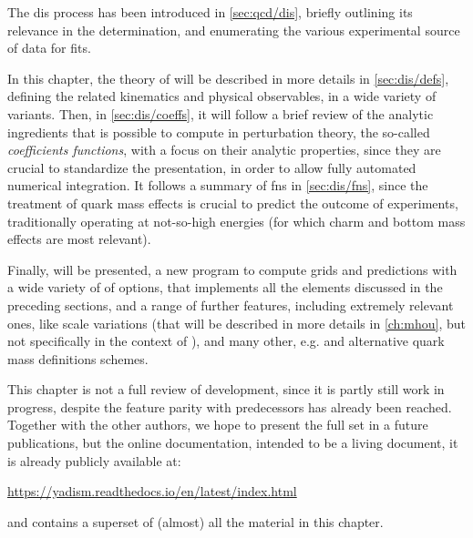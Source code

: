 
The \acrfull{dis} process has been introduced in \cref{sec:qcd/dis}, briefly
outlining its relevance in the \pdf determination, and enumerating the various
experimental source of \dis data for \pdf fits.

In this chapter, the theory of \dis will be described in more details in
\cref{sec:dis/defs}, defining the related kinematics and physical observables,
in a wide variety of variants.
Then, in \cref{sec:dis/coeffs}, it will follow a brief review of the analytic
ingredients that is possible to compute in perturbation theory, the so-called
\textit{coefficients functions}, with a focus on their analytic properties,
since they are crucial to standardize the presentation, in order to allow fully
automated numerical integration.
It follows a summary of \acrlong{fns} in \cref{sec:dis/fns}, since the
treatment of quark mass effects is crucial to predict the outcome of \dis
experiments, traditionally operating at not-so-high energies (for which charm
and bottom mass effects are most relevant).

Finally, \yadism will be presented, a new program to compute \dis grids and
predictions with a wide variety of of options, that implements all the elements
discussed in the preceding sections, and a range of further features, including
extremely relevant ones, like scale variations (that will be described in more
details in \cref{ch:mhou}, but not specifically in the context of \dis), and
many other, e.g. \tmc and alternative quark mass definitions schemes.

This chapter is not a full review of \yadism development, since it is partly
still work in progress, despite the feature parity with predecessors has
already been reached.
%
Together with the other authors, we hope to present the full set in a future
publications, but the online documentation, intended to be a living document,
it is already publicly available at:
\begin{center}
  \url{https://yadism.readthedocs.io/en/latest/index.html}
\end{center}
and contains a superset of (almost) all the material in this chapter.

